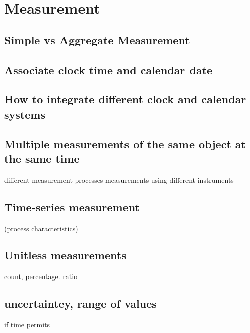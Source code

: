 \chapter{Measurement}

\section{Simple vs Aggregate Measurement}

\section{Associate clock time and calendar date}

\section{How to integrate different clock and calendar systems}

\section{Multiple measurements of the same object at the same time}
different measurement processes 
measurements using different instruments

\section{Time-series measurement}
(process characteristics)

\section{Unitless measurements}
count, percentage. ratio

\section{uncertaintey, range of values}
if time permits

